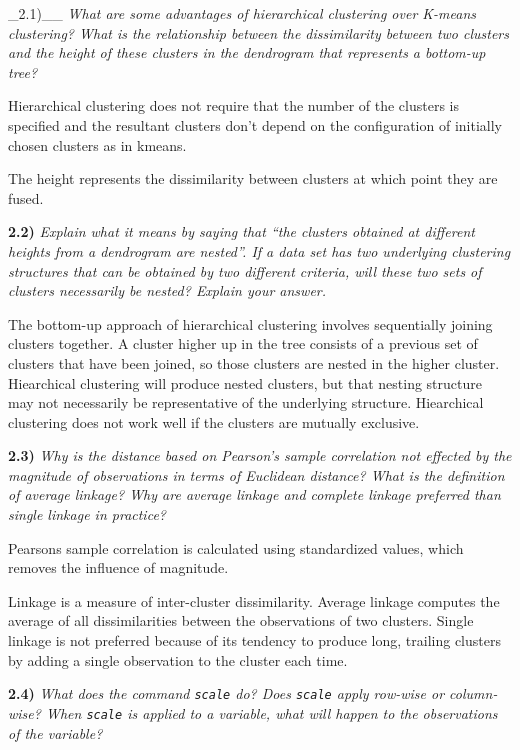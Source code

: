 \documentclass[
]{article}
\begin{document}
\_2.1)\_\_ \emph{What are some advantages of hierarchical clustering
over K-means clustering? What is the relationship between the
dissimilarity between two clusters and the height of these clusters in
the dendrogram that represents a bottom-up tree?}

Hierarchical clustering does not require that the number of the clusters
is specified and the resultant clusters don't depend on the
configuration of initially chosen clusters as in kmeans.

The height represents the dissimilarity between clusters at which point
they are fused.

\textbf{2.2)} \emph{Explain what it means by saying that ``the clusters
obtained at different heights from a dendrogram are nested''. If a data
set has two underlying clustering structures that can be obtained by two
different criteria, will these two sets of clusters necessarily be
nested? Explain your answer.}

The bottom-up approach of hierarchical clustering involves sequentially
joining clusters together. A cluster higher up in the tree consists of a
previous set of clusters that have been joined, so those clusters are
nested in the higher cluster. Hiearchical clustering will produce nested
clusters, but that nesting structure may not necessarily be
representative of the underlying structure. Hiearchical clustering does
not work well if the clusters are mutually exclusive.

\textbf{2.3)} \emph{Why is the distance based on Pearson's sample
correlation not effected by the magnitude of observations in terms of
Euclidean distance? What is the definition of average linkage? Why are
average linkage and complete linkage preferred than single linkage in
practice?}

Pearsons sample correlation is calculated using standardized values,
which removes the influence of magnitude.

Linkage is a measure of inter-cluster dissimilarity. Average linkage
computes the average of all dissimilarities between the observations of
two clusters. Single linkage is not preferred because of its tendency to
produce long, trailing clusters by adding a single observation to the
cluster each time.

\textbf{2.4)} \emph{What does the command \texttt{scale} do? Does
\texttt{scale} apply row-wise or column-wise? When \texttt{scale} is
applied to a variable, what will happen to the observations of the
variable?}
\end{document}
